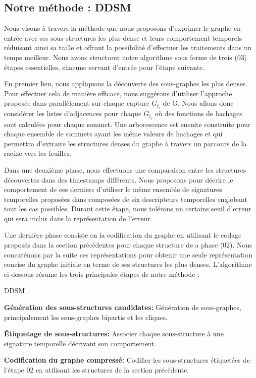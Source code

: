 \documentclass[a4paper,oneside,12pt]{report}
\theoremstyle{definition}
\begin{document}
			\subsection{Notre méthode : DDSM}
			 Nous visons à travers la méthode que nous proposons d'exprimer le graphe en entrée avec ses sous-structures les plus dense et leurs comportement temporels réduisant ainsi sa taille et offrant la possibilité d'effectuer les traitements dans un temps meilleur. Nous avons structurer notre algorithme sous forme de trois (03) étapes essentielles, chacune servant d'entrée pour l'étape suivante.
			 
			 En premier lieu, nous appliquons la découverte des sous-graphes les plus denses. Pour effectuer cela de manière efficace, nous suggérons d'utiliser l'approche proposée dans \citep{hernandez2014compressed} parallèlement sur chaque capture $G_{t_{i}}$ de G. Nous allons donc considérer les listes d'adjacences pour chaque $G_{t_{i}}$ où des fonctions de hachages sont calculées pour chaque sommet. Une arborescence est ensuite construite pour chaque ensemble de sommets ayant les même valeurs de hachages et qui permettra d'extraire les structures denses du graphe à travers un parcours de la racine vers les feuilles. 
			 
			 Dans une deuxième phase, nous effectuons une comparaison entre les structures découvertes dans des timestamps différents. Nous proposons pour décrire le comportement de ces derniers d'utiliser le même ensemble de signatures temporelles proposées dans \citep{shah2015timecrunch} composées de six descripteurs temporelles englobant tout les cas possibles. Durant cette étape, nous tolérons un certains seuil d'erreur qui sera inclus dans la représentation de l'erreur.
			 
			 Une dernière phase consiste en la codification du graphe en utilisant le codage proposés dans la section précédentes pour chaque structure de a phase (02). Nous concaténons par la suite ces représentations pour obtenir une seule représentation concise du graphe initiale en terme de ses structures les plus denses. 
			L'algorithme ci-dessous résume les trois principales étapes de notre méthode :
			\begin{algorithm}
					\label{alg:DDSM}
					\caption{DDSM}
					\label{Pseudo Algorithme de la méthode proposée (DDSM)}
				\begin{algorithmic} [1]
					\STATE \textbf{Génération des sous-structures candidates: }Génération de sous-graphes, principalement les sous-graphes bipartis et les cliques.
					
					\STATE  \textbf{Étiquetage de sous-structures: }Associer chaque sous-structure à une signature temporelle décrivant son comportement.
					
					\STATE \textbf{Codification du graphe compressé: }Codifier les sous-structures étiquetées de l'étape 02 en utilisant les structures de la section précédente.
				\end{algorithmic}
			\end{algorithm}
			
\end{document}
